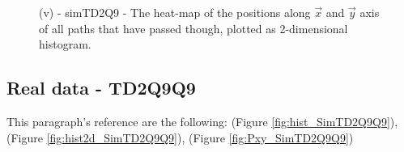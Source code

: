 \documentclass[class=article, crop=false]{standalone}
\begin{document}
\begin{figure}[!htb]
    \centering
        \quad\quad
    \caption{(v) - simTD2Q9 - The heat-map of the positions along $\vec x$ and $\vec y$ axis of all paths that have passed though, plotted as 2-dimensional histogram.}
    \label{fig:Pxy_SimTD2Q9}
\end{figure}


\FloatBarrier

\subsection{Real data - TD2Q9Q9}
This paragraph's reference are the following: (Figure \ref{fig:hist_SimTD2Q9Q9}), (Figure \ref{fig:hist2d_SimTD2Q9Q9}), (Figure \ref{fig:Pxy_SimTD2Q9Q9}) 
\end{document}
